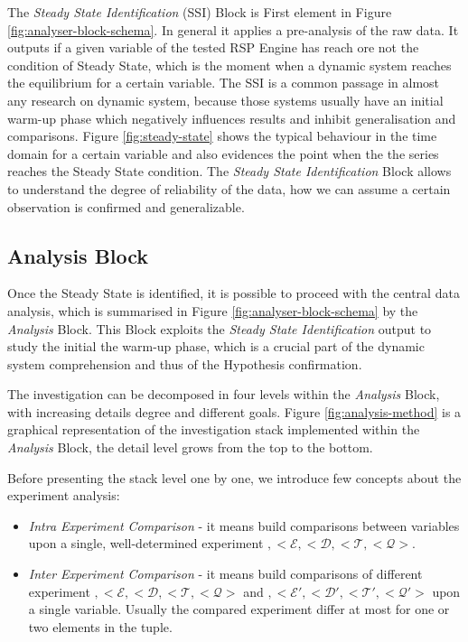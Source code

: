The \textit{Steady State Identification} (SSI) Block is First element in Figure \ref{fig:analyser-block-schema}. In general it applies a pre-analysis of the raw data. It outputs if a given variable of the tested RSP Engine has reach ore not the condition of Steady State, which is the moment when a dynamic system reaches the equilibrium for a certain variable. The SSI is a common passage in almost any research on dynamic system, because those systems usually have an initial warm-up phase which negatively influences results and inhibit generalisation and comparisons. Figure \ref{fig:steady-state} shows the typical behaviour in the time domain for a certain variable and also evidences the point when the the series reaches the Steady State condition. The \textit{Steady State Identification} Block allows to understand the degree of reliability of the data, how we can assume a certain observation is confirmed and generalizable. %


\subsection{Analysis Block}\label{sec:analyser-analysis-block}

Once the Steady State is identified, it is possible to proceed with the central data analysis, which is summarised in Figure \ref{fig:analyser-block-schema} by the \textit{Analysis} Block. This Block exploits the \textit{Steady State Identification} output to study the initial the warm-up phase, which is a crucial part of the dynamic system comprehension and thus of the Hypothesis confirmation.

The investigation can be decomposed in four levels within the \textit{Analysis} Block, with increasing details degree and different goals.  Figure \ref{fig:analysis-method} is a graphical representation of the investigation stack implemented within the \textit{Analysis} Block, the detail level grows from the top to the bottom.

Before presenting the stack level one by one, we introduce few concepts about the experiment analysis:
\begin{itemize}

\item \textit{Intra Experiment Comparison} -  it means build comparisons between variables upon a single, well-determined experiment $,<\mathcal{E},<\mathcal{D},<\mathcal{T},<\mathcal{Q}>$.

\item \textit{Inter Experiment Comparison} -  it means build comparisons of different experiment 
$,<\mathcal{E},<\mathcal{D},<\mathcal{T},<\mathcal{Q}>$ and $,<\mathcal{E}',<\mathcal{D}',<\mathcal{T}',<\mathcal{Q}'>$ upon a single variable. Usually the compared experiment differ at most for one or two elements in the tuple. 

\end{itemize}

